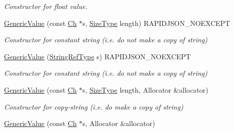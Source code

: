 \begin{DoxyCompactItemize}
\begin{DoxyCompactList}\small\item\em Constructor for float value. \end{DoxyCompactList}\item 
\hyperlink{a00130_a4d9af98141360cd801daab4ed1ca2c91}{Generic\+Value} (const \hyperlink{a00130_ade0e0ce64ccd5d852da57a35e720bafb}{Ch} $\ast$s, \hyperlink{a00677_a5ed6e6e67250fadbd041127e6386dcb5}{Size\+Type} length) R\+A\+P\+I\+D\+J\+S\+O\+N\+\_\+\+N\+O\+E\+X\+C\+E\+PT\hypertarget{a00130_a4d9af98141360cd801daab4ed1ca2c91}{}\label{a00130_a4d9af98141360cd801daab4ed1ca2c91}

\begin{DoxyCompactList}\small\item\em Constructor for constant string (i.\+e. do not make a copy of string) \end{DoxyCompactList}\item 
\hyperlink{a00130_abb2887958974fef1b2b5c8e32cc72ddb}{Generic\+Value} (\hyperlink{a00130_a32e0f30ee278072374c8168b14d3317f}{String\+Ref\+Type} s) R\+A\+P\+I\+D\+J\+S\+O\+N\+\_\+\+N\+O\+E\+X\+C\+E\+PT\hypertarget{a00130_abb2887958974fef1b2b5c8e32cc72ddb}{}\label{a00130_abb2887958974fef1b2b5c8e32cc72ddb}

\begin{DoxyCompactList}\small\item\em Constructor for constant string (i.\+e. do not make a copy of string) \end{DoxyCompactList}\item 
\hyperlink{a00130_a9ec2c7cda8c8845acfa3565c6b1b4e10}{Generic\+Value} (const \hyperlink{a00130_ade0e0ce64ccd5d852da57a35e720bafb}{Ch} $\ast$s, \hyperlink{a00677_a5ed6e6e67250fadbd041127e6386dcb5}{Size\+Type} length, Allocator \&allocator)\hypertarget{a00130_a9ec2c7cda8c8845acfa3565c6b1b4e10}{}\label{a00130_a9ec2c7cda8c8845acfa3565c6b1b4e10}

\begin{DoxyCompactList}\small\item\em Constructor for copy-\/string (i.\+e. do make a copy of string) \end{DoxyCompactList}\item 
\hyperlink{a00130_a9b72b2e3347d4cd77b16c3b45e8decf1}{Generic\+Value} (const \hyperlink{a00130_ade0e0ce64ccd5d852da57a35e720bafb}{Ch} $\ast$s, Allocator \&allocator)\hypertarget{a00130_a9b72b2e3347d4cd77b16c3b45e8decf1}{}\label{a00130_a9b72b2e3347d4cd77b16c3b45e8decf1}


\end{DoxyCompactItemize}
